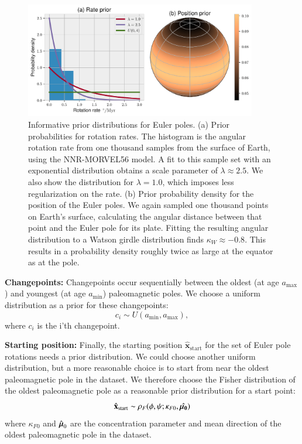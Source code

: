 \documentclass[preprint,12pt,authoryear]{elsarticle}
\newcommand{\mitbf}[1]{\hbox{\mathversion{bold}$#1$}}
\begin{document}
\begin{figure}
\includegraphics[width=0.9\textwidth]{figures/euler_pole_prior/euler_pole_prior.pdf}
\caption[Informative prior distributions for Euler poles]{Informative prior distributions for Euler poles. (a) Prior probabilities for rotation rates. The histogram is the angular rotation rate from one thousand samples from the surface of Earth, using the NNR-MORVEL56 model. A fit to this sample set with an exponential distribution obtains a scale parameter of $\lambda \approx 2.5$. We also show the distribution for $\lambda = 1.0$, which imposes less regularization on the rate. (b) Prior probability density for the position of the Euler poles. We again sampled one thousand points on Earth's surface, calculating the angular distance between that point and the Euler pole for its plate. Fitting the resulting angular distribution to a Watson girdle distribution finds $\kappa_W \approx -0.8$. This results in a probability density roughly twice as large at the equator as at the pole.}
\label{fig:euler_pole_prior}
\end{figure}

\textbf{Changepoints:} 
Changepoints occur sequentially between the oldest (at age $a_\mathrm{max}$) and
youngest (at age $a_\mathrm{min}$) paleomagnetic poles.
We choose a uniform distribution as a prior for these changepoints:
\begin{equation}
c_i \sim U( a_\mathrm{min}, a_\mathrm{max}),
\end{equation}
where $c_i$ is the i'th changepoint.

\textbf{Starting position:}
Finally, the starting position $\hat{\mathbf{x}}_\mathrm{start}$ for the set of Euler pole rotations needs a prior distribution.
We could choose another uniform distribution, but a more reasonable choice
is to start from near the oldest paleomagnetic pole in the dataset.
We therefore choose the Fisher distribution of the oldest paleomagnetic pole as a reasonable prior distribution for a start point:
\begin{equation}
\hat{\mathbf{x}}_\mathrm{start} \sim \rho_F(\phi, \psi; \kappa_{F0}, \hat{\mitbf{\mu_0}})
\end{equation}
where $\kappa_{F0}$ and $\hat{\mitbf{\mu}}_0$ are the concentration parameter and mean direction
of the oldest paleomagnetic pole in the dataset.
\end{document}
